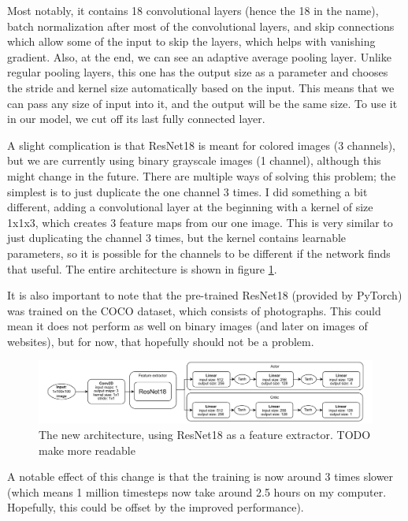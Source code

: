 \documentclass[
  digital,     %
  oneside,     %
  nosansbold,  %
  nocolorbold, %
  lof,         %
  lot,         %
]{fithesis4}
\begin{document}
Most notably, it contains 18 convolutional layers (hence the 18 in the name), batch normalization after most of the convolutional layers, and skip connections which allow some of the input to skip the layers, which helps with vanishing gradient. Also, at the end, we can see an adaptive average pooling layer. Unlike regular pooling layers, this one has the output size as a parameter and chooses the stride and kernel size automatically based on the input. This means that we can pass any size of input into it, and the output will be the same size. To use it in our model, we cut off its last fully connected layer.

A slight complication is that ResNet18 is meant for colored images (3 channels), but we are currently using binary grayscale images (1 channel), although this might change in the future. There are multiple ways of solving this problem; the simplest is to just duplicate the one channel 3 times. I did something a bit different, adding a convolutional layer at the beginning with a kernel of size 1x1x3, which creates 3 feature maps from our one image. This is very similar to just duplicating the channel 3 times, but the kernel contains learnable parameters, so it is possible for the channels to be different if the network finds that useful. The entire architecture is shown in figure \ref{fig:resnet_policy}.

It is also important to note that the pre-trained ResNet18 (provided by PyTorch) was trained on the COCO dataset, which consists of photographs. This could mean it does not perform as well on binary images (and later on images of websites), but for now, that hopefully should not be a problem.

\begin{figure}
    \centering
    \includegraphics[width=1\linewidth]{diagrams/resnet_policy.pdf}
    \caption{The new architecture, using ResNet18 as a feature extractor. TODO make more readable}
    \label{fig:resnet_policy}
\end{figure}

A notable effect of this change is that the training is now around 3 times slower (which means 1 million timesteps now take around 2.5 hours on my computer. Hopefully, this could be offset by the improved performance).
\end{document}
